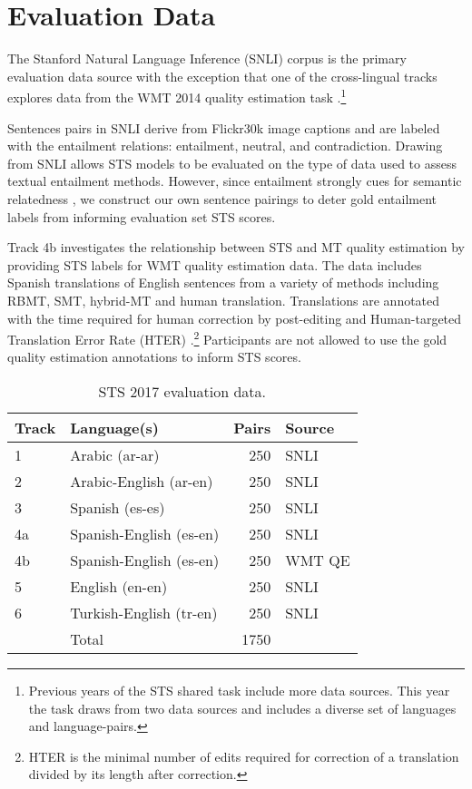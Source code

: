 \documentclass[11pt,a4paper]{article}
\begin{document}
\section{Evaluation Data}

The Stanford Natural Language Inference (SNLI) corpus \cite{snli:emnlp2015} is the primary evaluation data source with the exception that one of the cross-lingual tracks explores data from the WMT 2014 quality estimation task \cite{bojar-etal_WMT:2014}.\footnote{Previous years of the STS shared task include more data sources. This year the task draws from two data sources and includes a diverse set of languages and language-pairs.} 

Sentences pairs in SNLI derive from Flickr30k image captions \cite{young2014} and are labeled with the entailment relations: entailment, neutral, and contradiction. Drawing from SNLI allows STS models to be evaluated on the type of data used to assess textual entailment methods. However, since entailment strongly cues for semantic relatedness \cite{MARELLI14.363}, we construct our own sentence pairings to deter gold entailment labels from informing evaluation set STS scores. 

Track 4b investigates the relationship between STS and MT quality estimation by providing STS labels for WMT quality estimation data. The data includes Spanish translations of English sentences from a variety of methods including RBMT, SMT, hybrid-MT and human translation. Translations are annotated with the time required for human correction by post-editing and Human-targeted Translation Error Rate (HTER) \cite{snover2006}.\footnote{HTER is the minimal number of edits required for correction of a translation divided by its length after correction.} Participants are not allowed to use the gold quality estimation annotations to inform STS scores.

\begin{table}[t]
\small
\begin{center}
\begin{tabular}{|l|l|r|l|} 
\hline
     Track & Language(s) & Pairs &  Source\\
\hline
  1 & Arabic (ar-ar) & 250 & SNLI \\
  2 & Arabic-English (ar-en) & 250 & SNLI \\
  3 & Spanish (es-es) & 250 & SNLI \\
  4a & Spanish-English (es-en) & 250 & SNLI \\
  4b & Spanish-English (es-en) & 250 & WMT QE \\
  5  & English (en-en) & 250 & SNLI \\
  6 &  Turkish-English (tr-en) &  250 & SNLI \\
\hline
    & Total & 1750 & \\
\hline
\end{tabular}
\end{center}
\caption{STS 2017 evaluation data.
}
\label{tab:sts2017eval-summary}
\end{table}
\end{document}
